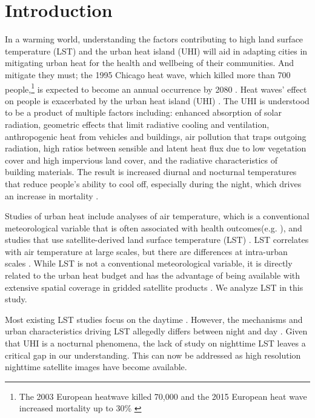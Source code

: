 \documentclass[final,3p,times,twocolumn,sort&compress]{elsarticle}
\begin{document}
\linenumbers

\section{Introduction}
In a warming world, understanding the factors contributing to high land surface temperature (LST) and the urban heat island (UHI) will aid in adapting cities in mitigating urban heat for the health and wellbeing of their communities.
And mitigate they must; the 1995 Chicago heat wave, which killed more than 700 people,\footnote{The 2003 European heatwave killed 70,000 \cite{Robine2008-ky} and the 2015 European heat wave increased mortality up to 30\% \cite{Vicedo-Cabrera2016-si}} is expected to become an annual occurrence by 2080 \cite{klinenberg2015heat}. 
Heat waves' effect on people is exacerbated by the urban heat island (UHI) \cite{Wicki2017-fv, Echevarria_Icaza2016-fr}.
The UHI is understood to be a product of multiple factors including: enhanced absorption of solar radiation, geometric effects that limit radiative cooling and ventilation, anthropogenic heat from vehicles and buildings, air pollution that traps outgoing radiation, high ratios between sensible and latent heat flux due to low vegetation cover and high impervious land cover, and the radiative characteristics of building materials. %
The result is increased diurnal and nocturnal temperatures that reduce people's ability to cool off, especially during the night, which drives an increase in mortality \cite{Echevarria_Icaza2016-fr, Murage2017-wj}.

Studies of urban heat include analyses of air temperature, which is a conventional meteorological variable that is often associated with health outcomes(e.g. \cite{Scott2016-lc}), and studies that use satellite-derived land surface temperature (LST) \cite{Imhoff2010-lf, Peng2012-iy, Peng2018-cp, Zhou2014-wc, Voogt2003-mm}.
LST correlates with air temperature at large scales, but there are differences at intra-urban scales \cite{Good2016-yk}.
While LST is not a conventional meteorological variable, it is directly related to the urban heat budget and has the advantage of being available with extensive spatial coverage in gridded satellite products \cite{Hung2006-qy}.
We analyze LST in this study.

Most existing LST studies focus on the daytime \cite{Peng2018-cp,Chun2018-so,Wang2019-water,Zhou2018-iy}.
However, the mechanisms and urban characteristics driving LST allegedly differs between night and day \cite{Hung2006-qy, Chun2017-mm, Nichol2005-mm, Wicki2017-fv, Echevarria_Icaza2016-fr,Sobstyl2018-wt, Peng2012-iy, Zhou2014-wc, Zhao2017-cc}. 
Given that UHI is a nocturnal phenomena, the lack of study on nighttime LST leaves a critical gap in our understanding. 
This can now be addressed as high resolution nighttime satellite images have become available.
\end{document}

